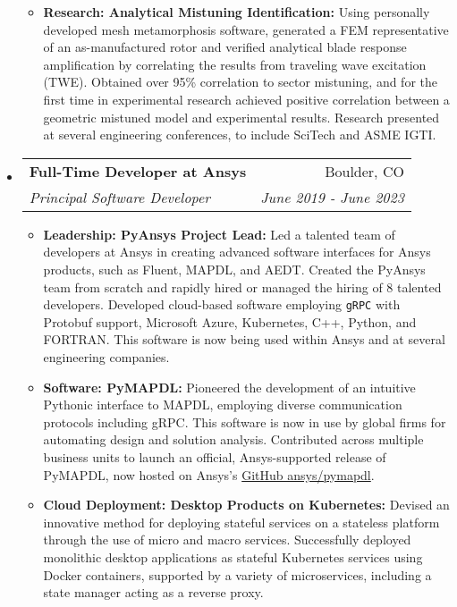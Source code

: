 \documentclass[letterpaper,11pt]{article}
\makeatletter
\newcommand{\resitem}[1]{\item #1 \vspace{-2pt}}
\newcommand{\ressubheading}[4]{
\begin{tabular*}{7.0in}{l@{\extracolsep{\fill}}r}
		\textbf{#1} & #2 \\
		\textit{#3} & \textit{#4} \\
\end{tabular*}\vspace{-6pt}}
\makeatother
\begin{document}
\begin{itemize}
\begin{itemize}
    \resitem{\textbf{Research: Analytical Mistuning Identification:} Using personally developed mesh metamorphosis software, generated a FEM representative of an as-manufactured rotor and verified analytical blade response amplification by correlating the results from traveling wave excitation (TWE). Obtained over 95\% correlation to sector mistuning, and for the first time in experimental research achieved positive correlation between a geometric mistuned model and experimental results. Research presented at several engineering conferences, to include SciTech and ASME IGTI.}
  \end{itemize}

\item
  \ressubheading{Full-Time Developer at Ansys}{Boulder, CO}{Principal Software Developer}{June 2019 - June 2023}
  \begin{itemize}
    \resitem{\textbf{Leadership: PyAnsys Project Lead:} Led a talented team of developers at Ansys in creating advanced software interfaces for Ansys products, such as Fluent, MAPDL, and AEDT. Created the PyAnsys team from scratch and rapidly hired or managed the hiring of 8 talented developers. Developed cloud-based software employing \texttt{gRPC} with Protobuf support, Microsoft Azure, Kubernetes, C++, Python, and FORTRAN. This software is now being used within Ansys and at several engineering companies.}
    \resitem{\textbf{Software: PyMAPDL:} Pioneered the development of an intuitive Pythonic interface to MAPDL, employing diverse communication protocols including gRPC. This software is now in use by global firms for automating design and solution analysis. Contributed across multiple business units to launch an official, Ansys-supported release of PyMAPDL, now hosted on Ansys's \href{https://github.com/ansys/pymapdl}{GitHub ansys/pymapdl}.}
    \resitem{\textbf{Cloud Deployment: Desktop Products on Kubernetes:} Devised an innovative method for deploying stateful services on a stateless platform through the use of micro and macro services. Successfully deployed monolithic desktop applications as stateful Kubernetes services using Docker containers, supported by a variety of microservices, including a state manager acting as a reverse proxy.}
  \end{itemize}


\end{itemize}
\end{document}

